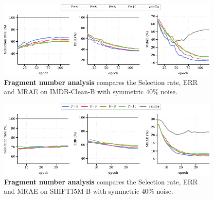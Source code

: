 \documentclass{article}
\theoremstyle{plain}
\theoremstyle{definition}
\theoremstyle{remark}
\begin{document}

\begin{figure}[th]
\begin{center}
\centerline{\includegraphics[width=\textwidth]{imgs/split_analysis_wide.pdf}}
\caption{\textbf{Fragment number analysis} compares the Selection rate, ERR and MRAE on IMDB-Clean-B with symmetric 40\% noise.}\label{fig:split_number}

\end{center}
\end{figure}

\begin{figure}[th]
\begin{center}
\centerline{\includegraphics[width=\textwidth]{imgs/split_analysis_wide_shift.pdf}}
\caption{\textbf{Fragment number analysis} compares the Selection rate, ERR and MRAE on SHIFT15M-B with symmetric 40\% noise.}\label{fig:split_number_shift}

\end{center}
\end{figure}

\end{document}
